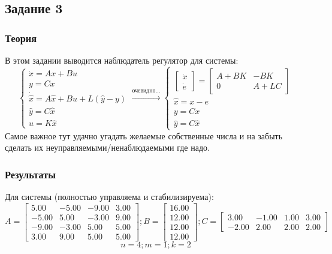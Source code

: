 \subsection{Задание 3}

\subsubsection{Теория}
В этом задании выводится наблюдатель регулятор для системы:
\[
        \begin{cases}
                \dot{x} = A x + B u\\
                y = C x \\
                \dot{\hat{x}} = A \hat{x} + B u + L(\hat{y} - y) \\
                \hat{y} = C \hat{x} \\
                u = K \hat{x}
        \end{cases} \xrightarrow{\text{очевидно...}}
        \begin{cases}
            \begin{bmatrix} 
                \dot{x} \\
                \dot{e}
            \end{bmatrix} = 
            \begin{bmatrix} 
                A + BK & -BK\\
                0 & A + LC
            \end{bmatrix}\\
            \hat{x} = x - e \\
            y = Cx \\
            \hat{y} = C \hat{x}
         \end{cases}
\]
Самое важное тут удачно угадать желаемые собственные числа и на забыть сделать их неуправляемыми/ненаблюдаемыми где надо.
\subsubsection{Результаты}
Для системы (полностью управляема и стабилизируема):
\[
    A = \begin{bmatrix}
        5.00 & -5.00 & -9.00 &  3.00\\
       -5.00 &  5.00 & -3.00 &  9.00\\
       -9.00 & -3.00 &  5.00 &  5.00\\
        3.00 &  9.00 &  5.00 &  5.00
      \end{bmatrix};
    B = \begin{bmatrix}
        16.00\\
        12.00\\
        12.00\\
        12.00
      \end{bmatrix};
    C = \begin{bmatrix}
        3.00 & -1.00 &  1.00 &  3.00\\
       -2.00 &  2.00 &  2.00 &  2.00
      \end{bmatrix}
\]
\[n = 4; m = 1; k = 2\]

